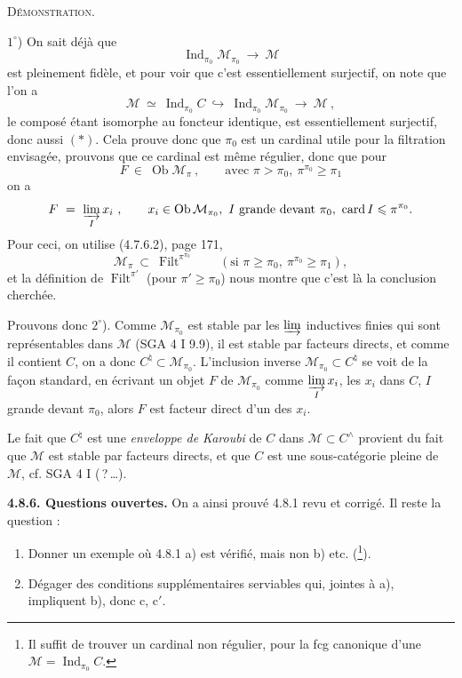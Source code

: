 \documentclass[11pt]{article}
\newcommand{\printedpage}[1]{\marginpar{\footnotesize p.~#1}}
\newcommand{\msp}[1]{\marginpar{\footnotesize [#1]}}
\newcommand{\Filt}{\operatorname{Filt}}
\newcommand{\card}{\operatorname{card}}
\newcommand{\Ob}{\operatorname{Ob}}
\newcommand{\Ind}{\operatorname{Ind}}
\begin{document}
\printedpage{71}

\textsc{Démonstration.}

$1^\circ$) On sait déjà que
\[
\Ind_{\pi_0}\mathcal{M}_{\pi_0} \ \longrightarrow \ \mathcal{M} \tag*{$(*)$}
\]
est pleinement fidèle, et pour voir que c'est essentiellement surjectif, on note que l'on a
\[
\mathcal{M} \ \simeq \ \Ind_{\pi_0}C \ \hookrightarrow \ \Ind_{\pi_0}\mathcal{M}_{\pi_0} \ \longrightarrow \ \mathcal{M} \ ,
\]
le composé étant isomorphe au foncteur identique, est essentiellement surjectif, donc aussi $(*)$. Cela prouve donc que $\pi_0$ est un cardinal utile pour la filtration envisagée, prouvons que ce cardinal est même régulier, donc que pour
\[
F \ \in \ \Ob\mathcal{M}_\pi \ , \qquad \text{avec } \pi>\pi_0,\ \pi^{\pi_0}\geqslant\pi_1
\]
on a
\[
F \ = \ \varinjlim_I x_i \ , \qquad x_i\in\Ob\mathcal{M}_{\pi_0},\ I \text{ grande devant } \pi_0,\ \card I\leqslant\pi^{\pi_0}.
\]
\msp{page 202}
Pour ceci, on utilise (4.7.6.2), page 171,
\[
\mathcal{M}_\pi \ \subset \ \Filt^{\pi^{\pi_0}} \qquad (\text{si } \pi\geqslant\pi_0,\ \pi^{\pi_0}\geqslant\pi_1),
\]
et la définition de $\Filt^{\pi'}$ (pour $\pi'\geqslant\pi_0$) nous montre que c'est là la conclusion cherchée.

Prouvons donc $2^\circ$). Comme $\mathcal{M}_{\pi_0}$ est stable par les $\varinjlim$ inductives finies qui sont représentables dans $\mathcal{M}$ (SGA 4 I 9.9), il est stable par facteurs directs, et comme il contient $C$, on a donc $C^\natural\subset\mathcal{M}_{\pi_0}$. L'inclusion inverse $\mathcal{M}_{\pi_0}\subset C^\natural$ se voit de la façon standard, en écrivant un objet $F$ de $\mathcal{M}_{\pi_0}$ comme $\varinjlim\limits_I x_i$, les $x_i$ dans $C$, $I$ grande devant $\pi_0$, alors $F$ est facteur direct d'un des $x_i$.

Le fait que $C^\natural$ est une \textit{enveloppe de Karoubi} de $C$ dans $\mathcal{M}\subset C^\wedge$ provient du fait que $\mathcal{M}$ est stable par facteurs directs, et que $C$ est une sous-catégorie pleine de $\mathcal{M}$, cf. SGA 4 I (\,?\,\dots).

\textbf{4.8.6. Questions ouvertes.} On a ainsi prouvé 4.8.1 revu et corrigé. Il reste la question :
\begin{enumerate}
\item[1)] Donner un exemple où 4.8.1 a) est vérifié, mais non b) etc. (\footnote{Il suffit de trouver un cardinal non régulier, pour la fcg canonique d'une $\mathcal{M}=\Ind_{\pi_0}C$.}).
\item[2)] Dégager des conditions supplémentaires serviables qui, jointes à a), impliquent b), donc c, c$'$.
\end{enumerate}
\end{document}
